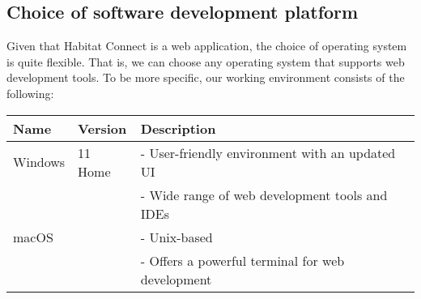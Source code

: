 \documentclass[conference]{IEEEtran}
\begin{document}
\subsection{Choice of software development platform}
Given that Habitat Connect is a web application, the choice of operating system is quite flexible. That is, we can choose any operating system that supports web development tools. To be more specific, our working environment consists of the following:
\begin{table}[htbp]
\centering
\begin{tabular}{|p{1.6cm}|l|p{3.6cm}|}
\hline
\textbf{Name} & \textbf{Version} & \textbf{Description}\\
\hline
Windows & 11 Home & 
- User-friendly environment with an updated UI \\
& & 
- Wide range of web development tools and IDEs \\
\hline


macOS &  & 
- Unix-based \\
& & 
- Offers a powerful terminal for web development \\


\hline
\end{tabular}
\end{table}
\end{document}
